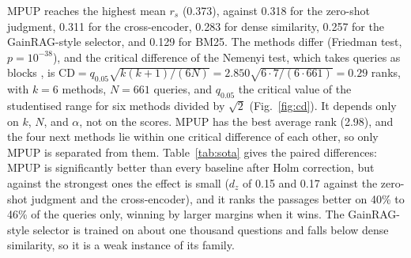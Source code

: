 \documentclass[preprint,12pt,authoryear]{elsarticle}
\begin{document}
MPUP reaches the highest mean $r_s$ (0.373), against 0.318 for the zero-shot judgment, 0.311 for the cross-encoder, 0.283 for dense similarity, 0.257 for the GainRAG-style selector, and 0.129 for BM25. The methods differ (Friedman test, $p = 10^{-38}$), and the critical difference of the Nemenyi test, which takes queries as blocks \citep{demsar2006}, is $\mathrm{CD} = q_{0.05}\sqrt{k(k+1)/(6N)} = 2.850\sqrt{6\cdot 7/(6\cdot 661)} = 0.29$ ranks, with $k = 6$ methods, $N = 661$ queries, and $q_{0.05}$ the critical value of the studentised range for six methods divided by $\sqrt{2}$ (Fig.~\ref{fig:cd}). It depends only on $k$, $N$, and $\alpha$, not on the scores. MPUP has the best average rank (2.98), and the four next methods lie within one critical difference of each other, so only MPUP is separated from them. Table~\ref{tab:sota} gives the paired differences: MPUP is significantly better than every baseline after Holm correction, but against the strongest ones the effect is small ($d_z$ of 0.15 and 0.17 against the zero-shot judgment and the cross-encoder), and it ranks the passages better on 40\% to 46\% of the queries only, winning by larger margins when it wins. The GainRAG-style selector is trained on about one thousand questions and falls below dense similarity, so it is a weak instance of its family.

\begin{table}[htbp]
    \centering
    \caption{Paired comparison of MPUP with each baseline on the 661 test queries of the third sample (laptop run, Qwen2.5-7B-Instruct 4-bit). $r_s$: mean within-query Spearman correlation (larger is better). Rank: average rank over queries among the six methods (1 is best). $\Delta r_s$: MPUP minus the baseline with its 95\% bootstrap interval (larger is better). $d_z$: standardised effect. $p_{\mathrm{H}}$: paired sign-flip permutation test with 200{,}000 flips, Holm-adjusted over the five comparisons (smaller is better; the smallest value it can resolve is about $5\times10^{-6}$).}
    \label{tab:sota}
    \footnotesize
\end{table}
\end{document}
